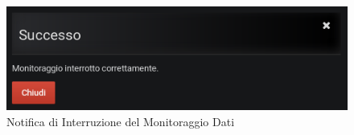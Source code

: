 \begin{figure}[H]
	\begin{center}
		\includegraphics[scale=0.6]{./images/NotificaInterruzione.png}
		 \caption{Notifica di Interruzione del Monitoraggio Dati}	
		 \label{NotificaInterruzione}
	\end{center}
\end{figure}
